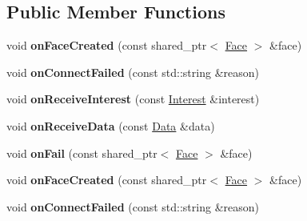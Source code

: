 \subsection*{Public Member Functions}
\begin{DoxyCompactItemize}
\item 
void {\bfseries on\+Face\+Created} (const shared\+\_\+ptr$<$ \hyperlink{classnfd_1_1Face}{Face} $>$ \&face)\hypertarget{classnfd_1_1tests_1_1SimpleEndToEndFixture_af28b40cf3c32802d929edcb8868fe5dc}{}\label{classnfd_1_1tests_1_1SimpleEndToEndFixture_af28b40cf3c32802d929edcb8868fe5dc}

\item 
void {\bfseries on\+Connect\+Failed} (const std\+::string \&reason)\hypertarget{classnfd_1_1tests_1_1SimpleEndToEndFixture_ab6763a62679045885ee3a218e577f582}{}\label{classnfd_1_1tests_1_1SimpleEndToEndFixture_ab6763a62679045885ee3a218e577f582}

\item 
void {\bfseries on\+Receive\+Interest} (const \hyperlink{classndn_1_1Interest}{Interest} \&interest)\hypertarget{classnfd_1_1tests_1_1SimpleEndToEndFixture_ad259337c6bb342f66936e32b2f06741d}{}\label{classnfd_1_1tests_1_1SimpleEndToEndFixture_ad259337c6bb342f66936e32b2f06741d}

\item 
void {\bfseries on\+Receive\+Data} (const \hyperlink{classndn_1_1Data}{Data} \&data)\hypertarget{classnfd_1_1tests_1_1SimpleEndToEndFixture_a53a18a2e27e7efcba8b9c9971c2d9b2e}{}\label{classnfd_1_1tests_1_1SimpleEndToEndFixture_a53a18a2e27e7efcba8b9c9971c2d9b2e}

\item 
void {\bfseries on\+Fail} (const shared\+\_\+ptr$<$ \hyperlink{classnfd_1_1Face}{Face} $>$ \&face)\hypertarget{classnfd_1_1tests_1_1SimpleEndToEndFixture_a46d0b1a692723b796b9dca42ae1da577}{}\label{classnfd_1_1tests_1_1SimpleEndToEndFixture_a46d0b1a692723b796b9dca42ae1da577}

\item 
void {\bfseries on\+Face\+Created} (const shared\+\_\+ptr$<$ \hyperlink{classnfd_1_1Face}{Face} $>$ \&face)\hypertarget{classnfd_1_1tests_1_1SimpleEndToEndFixture_af28b40cf3c32802d929edcb8868fe5dc}{}\label{classnfd_1_1tests_1_1SimpleEndToEndFixture_af28b40cf3c32802d929edcb8868fe5dc}

\item 
void {\bfseries on\+Connect\+Failed} (const std\+::string \&reason)\hypertarget{classnfd_1_1tests_1_1SimpleEndToEndFixture_ab6763a62679045885ee3a218e577f582}{}\label{classnfd_1_1tests_1_1SimpleEndToEndFixture_ab6763a62679045885ee3a218e577f582}


\end{DoxyCompactItemize}

